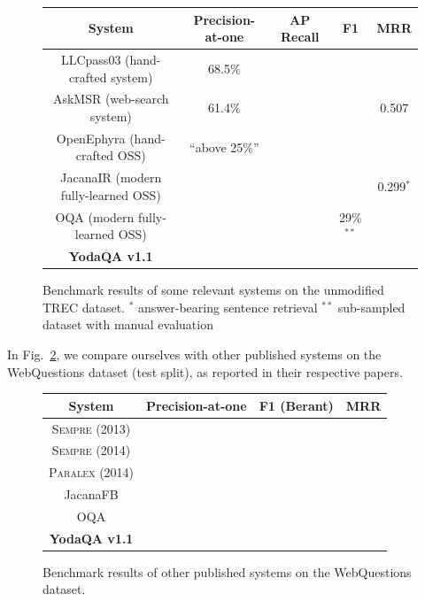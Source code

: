 \begin{figure}[t]
\centering
\begin{tabular}{|c|cccc|}
\hline
System & Precision-at-one & AP Recall & F1 & MRR \\ \hline
LLCpass03 \citep{LCC} (hand-crafted system) & 68.5\% & & & \\
AskMSR \citep{AskMSR} (web-search system) & 61.4\% & & & 0.507 \\ \hline
OpenEphyra \citep{Ephyra2006} (hand-crafted OSS) & ``above 25\%'' & & & \\
JacanaIR \citep{TreeEditIR2013Yao} (modern fully-learned OSS) & & & & 0.299$^*$ \\
OQA \citep{OQA} (modern fully-learned OSS) & & & 29\%$^{**}$ & \\ \hline
\textbf{YodaQA v1.1} &  &  &  &  \\
\hline
\end{tabular}
\vspace*{-0.2cm}
\caption{Benchmark results of some relevant systems on the unmodified TREC dataset.\quad
$^*$ answer-bearing sentence retrieval\quad
$^{**}$ sub-sampled dataset with manual evaluation}
\label{fig:trecbench}
\end{figure}

In Fig.~\ref{fig:wqbench}, we compare ourselves with other published systems
on the WebQuestions dataset (test split), as reported in their respective papers.

\begin{figure}[t]
\centering
\begin{tabular}{|c|ccc|}
\hline
System & Precision-at-one & F1 (Berant) & MRR \\ \hline
\textsc{Sempre} (2013) & & & \\
\textsc{Sempre} (2014) & & & \\
\textsc{Paralex} (2014) & & & \\
JacanaFB & & & \\
OQA \citep{OQA} & & & \\ \hline
\textbf{YodaQA v1.1} & & & \\
\hline
\end{tabular}
\vspace*{-0.2cm}
\caption{Benchmark results of other published systems on the WebQuestions dataset.}
\label{fig:wqbench}
\end{figure}
